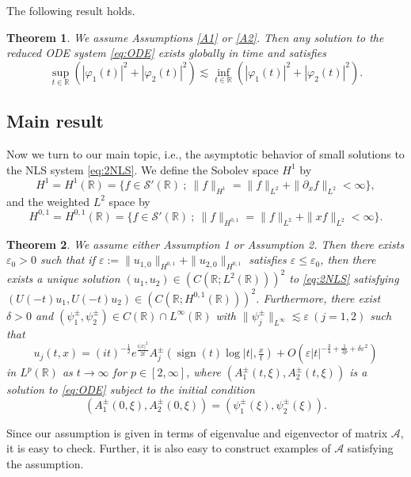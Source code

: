 \documentclass[11pt,a4paper,twosides]{amsart}
\theoremstyle{plain}
\newtheorem{theorem}{Theorem}[section]
\theoremstyle{remark}
\numberwithin{equation}{section}
\newcommand{\R}{\mathbb{R}}
\def\le{\leqslant}
\newcommand{\pt}{\partial}
\DeclareMathOperator{\sign}{sign}
\theoremstyle{definition}
\newcommand{\1}{{\bf 1}_{\{|x| < |t|\}}}
\renewcommand{\epsilon}{\varepsilon}
\begin{document}
The following result holds.

\begin{theorem}\label{thm:ODE}
We assume Assumptions \ref{A1} or \ref{A2}. 
Then any solution to the reduced ODE system
\eqref{eq:ODE} exists globally in time and satisfies
\[
	\sup_{t\in\R} (|\varphi_1(t)|^2+|\varphi_2(t)|^2)
	\lesssim \inf_{t\in\R} (|\varphi_1(t)|^2+|\varphi_2(t)|^2).
\]
\end{theorem}



\subsection{Main result}

Now we turn to our main topic, i.e., the asymptotic behavior of small solutions to the NLS system \eqref{eq:2NLS}.
We define the Sobolev space $H^1$ by
\[
H^1=H^1(\R)
=\{f\in{{\mathcal S}}'(\R)\ ; \ \|f\|_{H^1}
=\|f\|_{L^2}+\|\pt_x f\|_{L^2}<\infty\},
\]
and the weighted $L^2$ space by 
\[
H^{0,1}=H^{0,1}(\R)
=\{f\in{{\mathcal S}}'(\R)\ ; \ \|f\|_{H^{0,1}}
=\|f\|_{L^2}+\|xf\|_{L^2}<\infty\}.
\]


\begin{theorem}\label{thm:main}
  We assume either Assumption 1 or Assumption 2.
  Then there exists $\epsilon_0 > 0$ such that
  if $\epsilon := \|u_{1,0}\|_{H^{0,1}} + \|u_{2,0}\|_{H^{0,1}}$
  satisfies $\epsilon \le \epsilon_0$, then there exists a unique solution
  $(u_1, u_2) \in (C(\R; L^2(\R)))^2$ to \eqref{eq:2NLS} satisfying
  $(U(-t)u_1, U(-t)u_2) \in (C(\R;H^{0,1}(\R)))^2$.
  Furthermore, there exist
  $\delta > 0$ and $(\psi_1^\pm, \psi_2^\pm) \in C(\R) \cap L^\infty(\R)$
  with $\|\psi_j^\pm\|_{L^\infty} \lesssim \epsilon\ (j=1,2)$ such that
  \begin{equation}\label{eq:asymptest}
    u_j(t,x) = (it)^{-\frac12}e^{\frac{i|x|^2}{2t}}
    A_j^\pm(\sign(t)\log |t|, \tfrac{x}{t})
    + O(\epsilon|t|^{-\frac34 + \frac{1}{2p}+\delta \epsilon^2})
  \end{equation}
  in $L^p(\R)$ as $t \to \infty$ for $p \in [2,\infty]$, where
  $(A_1^\pm(t,\xi), A_2^\pm(t,\xi))$ is a solution to \eqref{eq:ODE}
  subject to the initial condition
  \begin{equation}
    (A_1^\pm(0,\xi), A_2^\pm(0,\xi)) = (\psi_1^\pm(\xi), \psi_2^\pm(\xi)).
  \end{equation}
\end{theorem}


Since our assumption is given in terms of eigenvalue and eigenvector of matrix $\mathscr{A}$,
it is easy to check.
Further, it is also easy to construct examples of $\mathscr{A}$ satisfying the assumption.
\end{document}
